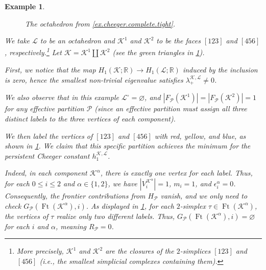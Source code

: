 \documentclass{article}
\newtheorem{example}{Example}[section]
\newcommand{\R}{\mathbb{R}}
\newcommand{\KK}{\mathcal{K}}
\newcommand{\LL}{\mathcal{L}}
\newcommand{\Ft}{\operatorname{Ft}}
\begin{document}
\begin{example}
\begin{figure}
    \caption{The octahedron from \cref{ex.cheeger.complete.tight}.}
    \label{fig:octahedron}
\end{figure}
We take $\LL$ to be an octahedron and $\KK^1$ and $\KK^2$ to be the faces $[123]$ and $[456]$, respectively.\footnote{More precisely, $\KK^1$ and $\KK^2$ are the closures of the $2$-simplices $[123]$ and $[456]$ (i.e., the smallest simplicial complexes containing them).} Let $\KK=\KK^1\coprod \KK^2$ (see the green triangles in \cref{fig:octahedron}). 

First, we notice that the map $H_1(\KK;\R) \to H_1(\LL;\R)$ induced by the inclusion is zero, hence the smallest non-trivial eigenvalue satisfies $\lambda_{+}^{\KK, \LL}\neq 0$. 

We also observe that in this example $\LL^\circ=\varnothing$, and $|F_{\mathcal{P}}(\KK^1)|=|F_{\mathcal{P}}(\KK^2)|=1$ for any effective partition $\mathcal{P}$ (since an effective partition must assign all three distinct labels to the three vertices of each component). 

We then label the vertices of $[123]$ and $[456]$ with red, yellow, and blue, as shown in \cref{fig:octahedron}. We claim that this specific partition achieves the minimum for the persistent Cheeger constant $h_{1}^{\KK, \LL}$.

Indeed, in each component $\KK^\alpha$, there is exactly one vertex for each label. Thus, for each $0 \leq i \leq 2$ and $\alpha \in \{1, 2\}$, we have $|V_i^{\KK^\alpha}|=1$, $m_i=1$, and $\epsilon_i^\alpha=0$. 
Consequently, the frontier contributions from $H_{\mathcal{P}}$ vanish, and we only need to check $G_{\mathcal{P}}(\Ft(\KK^\alpha), i)$. As displayed in \cref{fig:octahedron}, for each $2$-simplex $\tau\in \Ft(\KK^\alpha)$, the vertices of $\tau$ realize only two different labels. Thus, $G_{\mathcal{P}}(\Ft(\KK^\alpha), i)=\varnothing$ for each $i$ and $\alpha$, meaning $R_{\mathcal{P}} = 0$.


\end{example}
\end{document}
